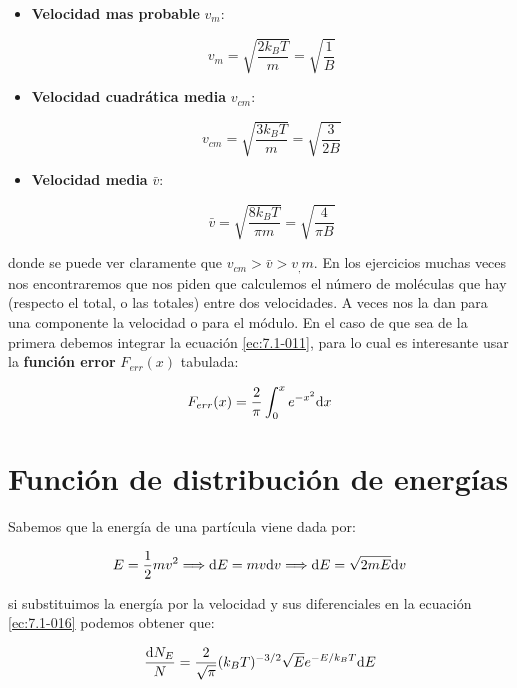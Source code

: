 \documentclass[12pt,a4paper,oneside]{book}
\begin{document}
\begin{itemize}
\item \textbf{Velocidad mas probable} $v_m$: 

\begin{equation}
v_m = \sqrt{\dfrac{2 k_B T}{m}}  = \sqrt{\dfrac{1}{B}}
\end{equation}

\item \textbf{Velocidad cuadrática media} $v_{cm}$:

\begin{equation}
v_{cm} = \sqrt{\dfrac{3 k_B T}{m}} = \sqrt{\dfrac{3}{2B}}
\end{equation}

\item \textbf{Velocidad media} $\bar{v}$:

\begin{equation}
\bar{v} =  \sqrt{\dfrac{8 k_B T}{\pi m}} = \sqrt{\dfrac{4}{\pi B}} 
\end{equation}
\end{itemize}

donde se puede ver claramente que $v_{cm} > \bar{v} > v_,m$. En los ejercicios muchas veces nos encontraremos que nos piden que calculemos el número de moléculas que hay (respecto el total, o las totales) entre dos velocidades. A veces nos la dan para una componente la velocidad o para el módulo. En el caso de que sea de la primera debemos integrar la ecuación \ref{ec:7.1-011}, para lo cual es interesante usar la \textbf{función error} $F_{err} (x)$ tabulada:

\begin{equation}
F_{err} (x) = \dfrac{2}{\pi} \int_0^x e^{-x^2} \mathrm{d} x
\end{equation}

\section{Función de distribución de energías}

Sabemos que la energía de una partícula viene dada por:

$$ E = \dfrac{1}{2} m v^2 \Longrightarrow \mathrm{d} E = m v \mathrm{d} v \Longrightarrow \mathrm{d} E = \sqrt{2 m E} \mathrm{d} v $$

si substituimos la energía por la velocidad y sus diferenciales en la ecuación \ref{ec:7.1-016} podemos obtener que:

\begin{equation}
\dfrac{\mathrm{d} N_E}{N} = \dfrac{2}{\sqrt{\pi}} (k_B T)^{-3/2} \sqrt{E} e^{-E/k_B T} \mathrm{d} E
\end{equation}
\end{document}
